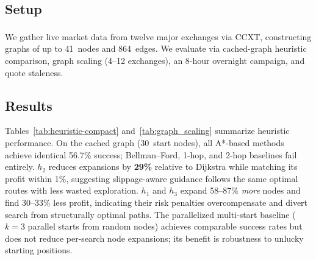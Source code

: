 \subsection{Setup}

We gather live market data from twelve major exchanges via CCXT\textsuperscript{\cite{ccxt2024}}, constructing graphs of up to 41~nodes and 864~edges. We evaluate via cached-graph heuristic comparison, graph scaling (4--12 exchanges), an 8-hour overnight campaign, and quote staleness.

\subsection{Results}

Tables~\ref{tab:heuristic-compact} and~\ref{tab:graph_scaling} summarize heuristic performance. On the cached graph (30~start nodes), all A*-based methods achieve identical 56.7\% success; Bellman--Ford, 1-hop, and 2-hop baselines fail entirely. $h_2$ reduces expansions by \textbf{29\%} relative to Dijkstra while matching its profit within 1\%, suggesting slippage-aware guidance follows the same optimal routes with less wasted exploration. $h_1$ and $h_3$ expand 58--87\% \emph{more} nodes and find 30--33\% less profit, indicating their risk penalties overcompensate and divert search from structurally optimal paths. The parallelized multi-start baseline ($k{=}3$ parallel starts from random nodes) achieves comparable success rates but does not reduce per-search node expansions; its benefit is robustness to unlucky starting positions.

